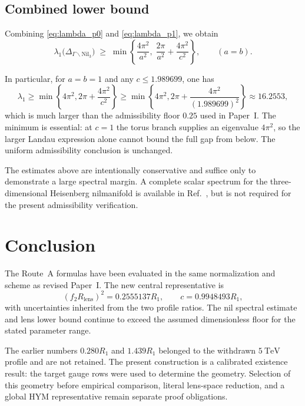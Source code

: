 \documentclass[11pt]{article}
\begin{document}
\subsection{Combined lower bound}

Combining \eqref{eq:lambda_p0} and \eqref{eq:lambda_p1}, we obtain
\begin{equation}
\lambda_1\big(\Delta_{\Gamma\backslash\mathrm{Nil}_3}\big)
\;\ge\;
\min\left\{
\frac{4\pi^2}{a^2},
\;
\frac{2\pi}{a^2}+\frac{4\pi^2}{c^2}
\right\},
\qquad (a=b).
\label{eq:lambda_min_final}
\end{equation}

In particular, for $a=b=1$ and any $c\le 1.989699$, one has
\[
\lambda_1 \ge
\min\left\{4\pi^2,2\pi+\frac{4\pi^2}{c^2}\right\}
\ge\min\left\{4\pi^2,2\pi+\frac{4\pi^2}{(1.989699)^2}\right\}
\approx16.2553,
\]
which is much larger than the admissibility floor $0.25$ used in Paper~I.
The minimum is essential: at $c=1$ the torus branch supplies an eigenvalue
$4\pi^2$, so the larger Landau expression alone cannot bound the full gap
from below. The uniform admissibility conclusion is unchanged.

\begin{remark}
The estimates above are intentionally conservative and suffice only to demonstrate a large
spectral margin. A complete scalar spectrum for the three-dimensional
Heisenberg nilmanifold is available in Ref.~\cite{AndriotTsimpis}, but is not
required for the present admissibility verification.
\end{remark}
\section{Conclusion}

The Route~A formulas have been evaluated in the same normalization and scheme
as revised Paper~I.  The new central representative is
\[
 (f_2R_{\mathrm{lens}})^2=0.2555137R_1,
 \qquad c=0.9948493R_1,
\]
with uncertainties inherited from the two profile ratios.  The nil spectral
estimate and lens lower bound continue to exceed the assumed dimensionless
floor for the stated parameter range.

The earlier numbers $0.280R_1$ and $1.439R_1$ belonged to the withdrawn
$5~\mathrm{TeV}$ profile and are not retained.  The present construction is a
calibrated existence result: the target gauge rows were used to determine the
geometry.  Selection of this geometry before empirical comparison, literal
lens-space reduction, and a global HYM representative remain separate proof
obligations.
\end{document}
